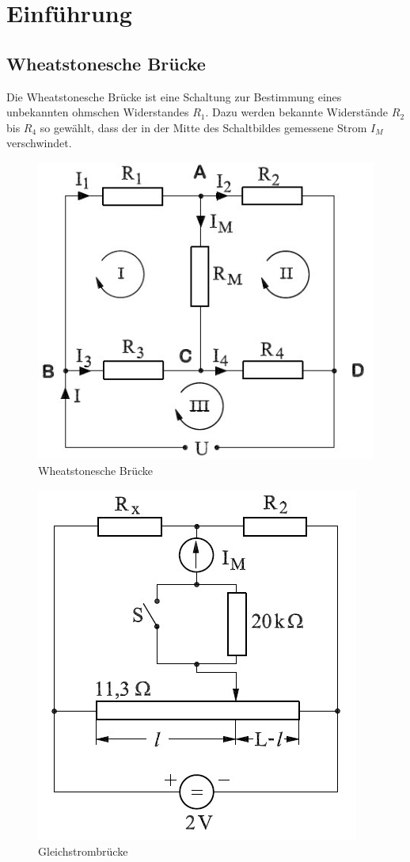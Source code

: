 \section{Einführung}
\subsection{Wheatstonesche Brücke}
Die Wheatstonesche Brücke ist eine Schaltung zur Bestimmung eines unbekannten ohmschen Widerstandes $R_1$. Dazu werden bekannte Widerstände $R_2$ bis $R_4$ so gewählt, dass der in der Mitte des Schaltbildes gemessene Strom $I_M$ verschwindet. 
\begin{figure}[h]
  \centering
  \includegraphics{wheat1.jpg}
  \caption{Wheatstonesche Brücke}
  \label{fig:wheat1}
\end{figure}
\begin{figure}[h]
  \centering
  \includegraphics{wheatgleich.jpg}
  \caption{Gleichstrombrücke}
  \label{fig:wheatgleich}
\end{figure}
